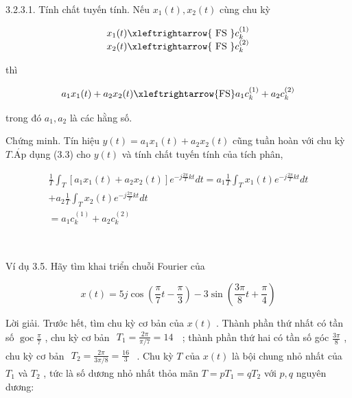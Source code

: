 \documentclass[
  10
]{article}
\begin{document}
3.2.3.1. Tính chất tuyến tính. Nếu \(x _ { 1 } ( t ) , x _ { 2 } ( t )\)
cùng chu kỳ

\[
\begin{array}{l} x _ {1} (t) \xleftrightarrow {\text { FS }} c _ {k} ^ {(1)} \\ x _ {2} (t) \xleftrightarrow {\text { FS }} c _ {k} ^ {(2)} \end{array}
\]

thì

\[
a _ {1} x _ {1} (t) + a _ {2} x _ {2} (t) \xleftrightarrow {\mathrm{FS}} a _ {1} c _ {k} ^ {(1)} + a _ {2} c _ {k} ^ {(2)}
\]

trong đó \(a _ { 1 } , a _ { 2 }\) là các hằng số.

Chứng minh. Tín hiệu
\(y ( t ) = a _ { 1 } x _ { 1 } ( t ) + a _ { 2 } x _ { 2 } ( t )\) cũng
tuần hoàn với chu kỳ \(T . { \mathrm { { \acute { A p } } } }\) dụng
(3.3) cho \(y ( t )\) và tính chất tuyến tính của tích phân,

\[
\begin{array}{r} \frac {1}{T} \int_ {T} [ a _ {1} x _ {1} (t) + a _ {2} x _ {2} (t) ] e ^ {- j \frac {2 \pi}{T} k t} d t = a _ {1} \frac {1}{T} \int_ {T} x _ {1} (t) e ^ {- j \frac {2 \pi}{T} k t} d t \\ + a _ {2} \frac {1}{T} \int_ {T} x _ {2} (t) e ^ {- j \frac {2 \pi}{T} k t} d t \\ = a _ {1} c _ {k} ^ {(1)} + a _ {2} c _ {k} ^ {(2)} \end{array}
\]



Ví dụ 3.5. Hãy tìm khai triển chuỗi Fourier của

\[
x (t) = 5 j \cos (\frac {\pi}{7} t - \frac {\pi}{3}) - 3 \sin (\frac {3 \pi}{8} t + \frac {\pi}{4})
\]

Lời giải. Trước hết, tìm chu kỳ cơ bản của \(x ( t )\) . Thành phần thứ
nhất có tần số \(\operatorname { g o c } { \frac { \pi } { 7 } }\) , chu
kỳ cơ bản
\(\begin{array} { r }  T _ { 1 } = \frac { 2 \pi } { \pi / 7 } = 1 4 \ \end{array}\)
; thành phần thứ hai có tần số góc \(\frac { 3 \pi } { 8 }\) , chu kỳ cơ
bản
\(\begin{array} { r } { T _ { 2 } = \frac { 2 \pi } { 3 \pi / 8 } = \frac { 1 6 } { 3 } } \end{array}\)
. Chu kỳ \(T\) của \(x ( t )\) là bội chung nhỏ nhất của \(T _ { 1 }\)
và \(T _ { 2 }\) , tức là số dương nhỏ nhất thỏa mãn
\(T = p T _ { 1 } = q T _ { 2 }\) với \(p , q\) nguyên dương:
\end{document}
